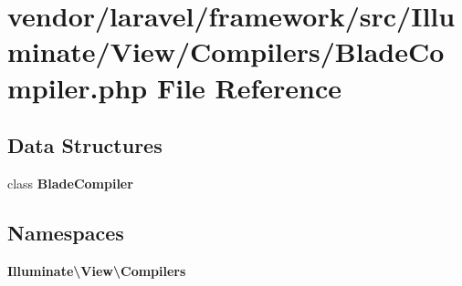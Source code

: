 \section{vendor/laravel/framework/src/\+Illuminate/\+View/\+Compilers/\+Blade\+Compiler.php File Reference}
\label{_blade_compiler_8php}
\subsection*{Data Structures}
\begin{DoxyCompactItemize}
\item 
class {\bf Blade\+Compiler}
\end{DoxyCompactItemize}
\subsection*{Namespaces}
\begin{DoxyCompactItemize}
\item 
 {\bf Illuminate\textbackslash{}\+View\textbackslash{}\+Compilers}
\end{DoxyCompactItemize}

